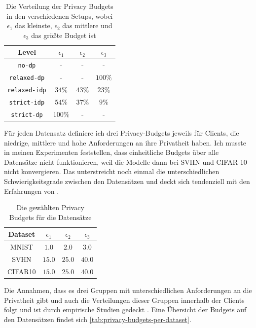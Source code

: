 \begin{table}[tb]
	\centering
	\caption{Die Verteilung der Privacy Budgets in den verschiedenen Setups, wobei $\epsilon_1$ das kleinste, $\epsilon_2$ das mittlere und $\epsilon_3$ das größte Budget ist}
	\begin{tabular}{cccc}
		\toprule
		Level & $\epsilon_1$ & $\epsilon_2$ & $\epsilon_3$ \\
		\midrule
		\texttt{no-dp} & - & - & - \\
		\texttt{relaxed-dp} & - & - & $100\%$ \\
		\texttt{relaxed-idp} & $34\%$ & $43\%$ & $23\%$ \\
		\texttt{strict-idp} & $54\%$ & $37\%$ & $9\%$ \\
		\texttt{strict-dp} & $100\%$ & - & - \\
		\bottomrule
	\end{tabular}
	\label{tab:privacy-niveau-distribution}
\end{table}

Für jeden Datensatz definiere ich drei Privacy-Budgets jeweils für Clients, die niedrige, mittlere und hohe Anforderungen an ihre Privatheit haben. Ich musste in meinen Experimenten feststellen, dass einheitliche Budgets über alle Datensätze nicht funktionieren, weil die Modelle dann bei SVHN und CIFAR-10 nicht konvergieren. Das unterstreicht noch einmal die unterschiedlichen Schwierigkeitsgrade zwischen den Datensätzen und deckt sich tendenziell mit den Erfahrungen von \textcite{sun:2021}.

\begin{table}[tb]
	\centering
	\caption{Die gewählten Privacy Budgets für die Datensätze}
	\begin{tabular}{cccc}
		\toprule
		Dataset & $\epsilon_1$ & $\epsilon_2$ & $\epsilon_3$ \\
		\midrule
		MNIST & $1.0$ & $2.0$ & $3.0$ \\
		SVHN & $15.0$ & $25.0$ & $40.0$ \\
		CIFAR10 & $15.0$ & $25.0$ & $40.0$ \\
		\bottomrule
	\end{tabular}
	\label{tab:privacy-budgets-per-dataset}
\end{table}

Die Annahmen, dass es drei Gruppen mit unterschiedlichen Anforderungen an die Privatheit gibt und auch die Verteilungen dieser Gruppen innerhalb der Clients folgt \textcite{boenisch:2023} und ist durch empirische Studien gedeckt \cite{jensen:2005, acquisti:2005}. Eine Übersicht der Budgets auf den Datensätzen findet sich \autoref{tab:privacy-budgets-per-dataset}.

